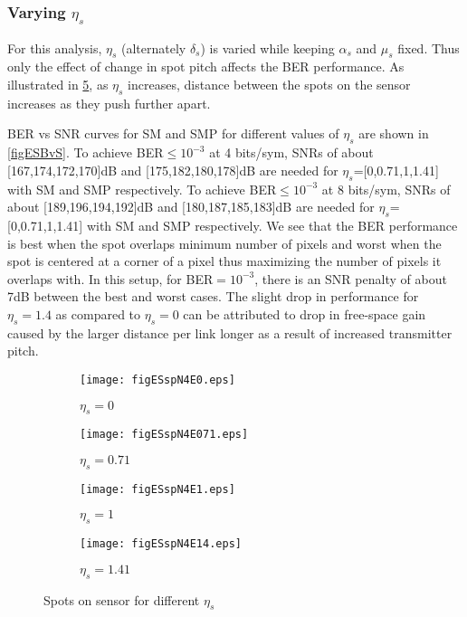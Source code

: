 \newpage
\subsubsection{Varying $\eta_{s}$}
\label{subsubsec:osmResultsEta}

For this analysis, $\eta_{s}$ (alternately $\delta_{s}$) is varied while keeping $\alpha_{s}$ and $\mu_{s}$ fixed. Thus only the effect of change in spot pitch affects the BER performance. As illustrated in \figurename{ \ref{figESSpots}}, as $\eta_{s}$ increases, distance between the spots on the sensor increases as they push further apart.

BER vs SNR curves for SM and SMP for different values of $\eta_{s}$ are shown in \figurename{ \ref{figESBvS}}. To achieve BER$\leq 10^{-3}$ at 4 bits/sym, SNRs of about [167,174,172,170]dB and [175,182,180,178]dB are needed for $\eta_{s}$=[0,0.71,1,1.41] with SM and SMP respectively. To achieve BER$\leq 10^{-3}$ at 8 bits/sym, SNRs of about [189,196,194,192]dB and [180,187,185,183]dB are needed for $\eta_{s}$=[0,0.71,1,1.41] with SM and SMP respectively. We see that the BER performance is best when the spot overlaps minimum number of pixels and worst when the spot is centered at a corner of a pixel thus maximizing the number of pixels it overlaps with. In this setup, for BER$=10^{-3}$, there is an SNR penalty of about 7dB between the best and worst cases. The slight drop in performance for $\eta_{s}=1.4$ as compared to $\eta_{s}=0$ can be attributed to drop in free-space gain caused by the larger distance per link longer as a result of increased transmitter pitch.

\begin{figure}
	\centering
		\begin{subfigure}{0.49\textwidth}
			\centering
			\texttt{[image: figESspN4E0.eps]}
			\caption{$\eta_{s}=0$}
			\label{figESspN4E0}
		\end{subfigure}
		\hfill
		\begin{subfigure}{0.49\textwidth}
			\centering
			\texttt{[image: figESspN4E071.eps]}
			\caption{$\eta_{s}=0.71$}
			\label{figESspN4E071}
		\end{subfigure}
		\vfill
		\begin{subfigure}{0.49\textwidth}
			\centering
			\texttt{[image: figESspN4E1.eps]}
			\caption{$\eta_{s}=1$}
			\label{figESspN4E1}
		\end{subfigure}
		\hfill
		\begin{subfigure}{0.49\textwidth}
			\centering
			\texttt{[image: figESspN4E14.eps]}
			\caption{$\eta_{s}=1.41$}
			\label{figESspN4E14}
		\end{subfigure}
		
		\caption{Spots on sensor for different $\eta_{s}$}
		\label{figESSpots}
\end{figure}

